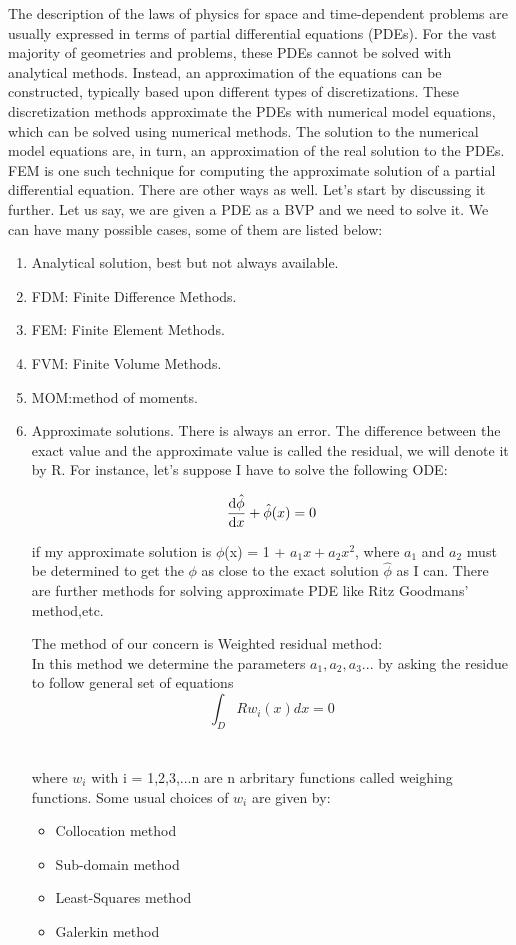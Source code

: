 \documentclass[9pt]{article}
\begin{document}
The description of the laws of physics for space and time-dependent problems are usually expressed in terms of partial differential equations (PDEs). For the vast majority of geometries and problems, these PDEs cannot be solved with analytical methods. Instead, an approximation of the equations can be constructed, typically based upon different types of discretizations. These discretization methods approximate the PDEs with numerical model equations, which can be solved using numerical methods. The solution to the numerical model equations are, in turn, an approximation of the real solution to the PDEs. FEM is one such technique for computing the approximate solution of a partial differential equation. There are other ways as well. Let's start by discussing it further. Let us say, we are given a PDE as a BVP and we need to solve it. We can have many possible cases, some of them are listed below:
\begin{enumerate}
  \item Analytical solution, best but not always available.
   \item FDM: Finite Difference Methods.
   \item FEM: Finite Element Methods.
   \item FVM: Finite Volume Methods.
   \item MOM:method of moments.
   \item Approximate solutions. There is always an error. The difference between the exact value and the approximate value is called the residual, we will denote it by R. For instance, let’s suppose I have to solve the following ODE:
   

\[   
    \dv{\hat{\phi}}{x} + \hat{\phi}(x) = 0
\]

if my approximate solution is $\phi$(x) = 1 + $a_1x + a_2x^2$, where $a_1$ and $a_2$ must be determined to get the $\phi$ as close to the exact solution $\hat{\phi}$ as I can.   
There are further methods for solving approximate PDE like Ritz Goodmans' method,etc. 

The method of our concern is Weighted residual method:
\\ In this method we determine the parameters $a_1, a_2, a_3... $ by asking the residue to follow general set of equations \\ 

\[
 \int_{D} {R}{w_i(x)}{dx} = 0
\]
\\ \\ where $w_i$ with i = 1,2,3,...n are n arbritary functions called weighing functions.
Some usual choices of $w_i$ are given by:

\begin{itemize}
  \item Collocation method
  \item Sub-domain method
  \item Least-Squares method
  \item Galerkin method
\end{itemize}   
\end{enumerate}
\end{document}
